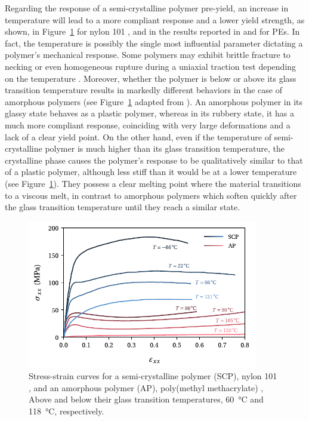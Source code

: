 Regarding the response of a semi-crystalline polymer pre-yield, an increase in temperature will lead to a more compliant response and a lower yield strength, as shown, in Figure~\ref{fig:scheme_effect_temperature} for nylon 101 \citep{khanThermomechanicalResponseNylon2006}, and in the results reported in \cite{brownInfluenceMolecularConformation2007} and \cite{hobeikaTemperatureStrainRate2000} for PEs.
In fact, the temperature is possibly the single most influential parameter dictating a polymer's mechanical response.
Some polymers may exhibit brittle fracture to necking or even homogeneous rupture during a uniaxial traction test depending on the temperature \citep{wardIntroductionMechanicalProperties2004}.
Moreover, whether the polymer is below or above its glass transition temperature results in markedly different behaviors in the case of amorphous polymers (see Figure~\ref{fig:scheme_effect_temperature} adapted from \cite{vanloockDeformationFailureMaps2018}).
An amorphous polymer in its glassy state behaves as a plastic polymer, whereas in its rubbery state, it has a much more compliant response, coinciding with very large deformations and a lack of a clear yield point.
On the other hand, even if the temperature of semi-crystalline polymer is much higher than its glass transition temperature, the crystalline phase causes the polymer's response to be qualitatively similar to that of a plastic polymer, although less stiff than it would be at a lower temperature (see Figure~\ref{fig:scheme_effect_temperature}).
They possess a clear melting point where the material transitions to a viscous melt, in contrast to amorphous polymers which soften quickly after the glass transition temperature until they reach a similar state.
\begin{figure}[hbtp]
	\centering
	\includegraphics[width=0.9\textwidth]{figures/scheme_effect_temperature}
	\caption{Stress-strain curves for a semi-crystalline polymer (SCP), nylon 101 \citep{khanThermomechanicalResponseNylon2006}, and an amorphous polymer (AP), poly(methyl methacrylate) \citep{vanloockDeformationFailureMaps2018}, Above and below their glass transition temperatures, \SI{60}{\celsius} and \SI{118}{\celsius}, respectively.}
\label{fig:scheme_effect_temperature}
\end{figure}

